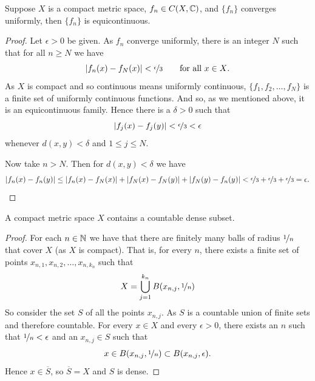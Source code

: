 \begin{prop}
Suppose $X$ is a compact metric space,
$f_n \in C(X,{\mathbb{C}})$, and $\{ f_n \}$
converges uniformly, then $\{ f_n \}$ is equicontinuous.
\end{prop}

\begin{proof}
Let $\epsilon > 0$ be given.
As $f_n$ converge uniformly, there is an integer $N$ such that for
all $n \geq N$ we have
\begin{equation*}
\lvert {f_n(x)-f_N(x)} \rvert < \nicefrac{\epsilon}{3} \qquad \text{for all $x \in X$}.
\end{equation*}
As $X$ is compact and so continuous means
uniformly continuous,
$\{ f_1,f_2,\ldots,f_N \}$ is a finite set of uniformly continuous
functions.  And so, as we mentioned above, it is an equicontinuous family.  Hence
there is a $\delta > 0$ such that
\begin{equation*}
\lvert {f_j(x)-f_j(y)} \rvert < \nicefrac{\epsilon}{3} < \epsilon
\end{equation*}
whenever $d(x,y) < \delta$ and $1 \leq j \leq N$.

Now take $n > N$.  Then for $d(x,y) < \delta$ we have
\begin{equation*}
\lvert {f_n(x)-f_n(y)} \rvert
\leq
\lvert {f_n(x)-f_N(x)} \rvert
+
\lvert {f_N(x)-f_N(y)} \rvert
+
\lvert {f_N(y)-f_n(y)} \rvert
<
\nicefrac{\epsilon}{3}
+
\nicefrac{\epsilon}{3}
+
\nicefrac{\epsilon}{3}
=\epsilon . \qedhere
\end{equation*}
\end{proof}

\begin{prop}
A compact metric space $X$ contains a countable dense subset.
\end{prop}

\begin{proof}
For each $n \in {\mathbb{N}}$ we have that there are finitely many
balls of radius $\nicefrac{1}{n}$ that cover $X$ (as $X$ is compact). That is,
for every $n$, there exists
a finite set of points $x_{n,1},x_{n,2},\ldots,x_{n,k_n}$ such that
\begin{equation*}
X= \bigcup_{j=1}^{k_n} B(x_{n,j},\nicefrac{1}{n})
\end{equation*}
So consider the set $S$ of all the points $x_{n,j}$.  As $S$ is a countable
union of finite sets and therefore countable.  For every $x \in X$
and every $\epsilon > 0$, there exists an $n$ such that
$\nicefrac{1}{n} < \epsilon$ and an $x_{n,j} \in S$ such that
\begin{equation*}
x \in B(x_{n,j},\nicefrac{1}{n}) \subset B(x_{n,j},\epsilon) .
\end{equation*}
Hence $x \in \overline{S}$, so $\overline{S} = X$ and $S$ is dense.
\end{proof}

